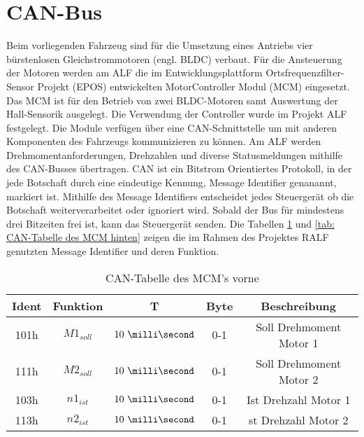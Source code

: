  

\section{CAN-Bus}
\label{sec: CAN-Bus}

Beim vorliegenden Fahrzeug sind für die Umsetzung eines Antriebs vier bürstenlosen Gleichstrommotoren (engl. BLDC) verbaut.	
Für die Ansteuerung der Motoren werden am ALF die im Entwicklungsplattform Ortsfrequenzfilter-Sensor Projekt (EPOS) entwickelten MotorController Modul (MCM) eingesetzt. Das MCM ist für den Betrieb von zwei BLDC-Motoren samt Auswertung der Hall-Sensorik ausgelegt. Die Verwendung der Controller wurde im Projekt ALF festgelegt. Die Module verfügen über eine CAN-Schnittstelle um mit anderen Komponenten des Fahrzeugs kommunizieren zu können.\newline
Am ALF werden Drehmomentanforderungen, Drehzahlen und diverse Statusmeldungen mithilfe des CAN-Busses übertragen. CAN ist ein Bitstrom Orientiertes Protokoll, in der jede Botschaft durch eine eindeutige Kennung, Message Identifier genanannt, markiert ist.
Mithilfe des Message Identifiers entscheidet jedes Steuergerät ob die Botschaft weiterverarbeitet oder ignoriert wird. Sobald der Bus für mindestens drei Bitzeiten frei ist, kann das Steuergerät senden. Die Tabellen \ref{tab: CAN-Tabelle des MCM vorne} und \ref{tab: CAN-Tabelle des MCM hinten} zeigen die im Rahmen des Projektes RALF genutzten Message Identifier und deren Funktion. \cite{schmidgall,alf}

\begin{table}[H]
	\centering
	\caption{CAN-Tabelle des MCM's vorne}
	\label{tab: CAN-Tabelle des MCM vorne}
	\begin{tabular}{c|c|c|c|c}
		\hline
		Ident       &       Funktion       &           T       &  Byte & Beschreibung  \\ \hline \hline
		101h		&		$M1_{soll}$		&			$10\ \milli\second$ & 0-1 & Soll Drehmoment Motor 1 \\
		111h		&		$M2_{soll}$		&			$10\ \milli\second$ & 0-1 & Soll Drehmoment Motor 2 \\
		103h		&		$n1_{ist}$		&			$10\ \milli\second$ & 0-1 & Ist Drehzahl Motor 1 \\
		113h		&		$n2_{ist}$		&			$10\ \milli\second$ & 0-1 & st Drehzahl Motor 2 \\ \hline
	\end{tabular}
\end{table}


